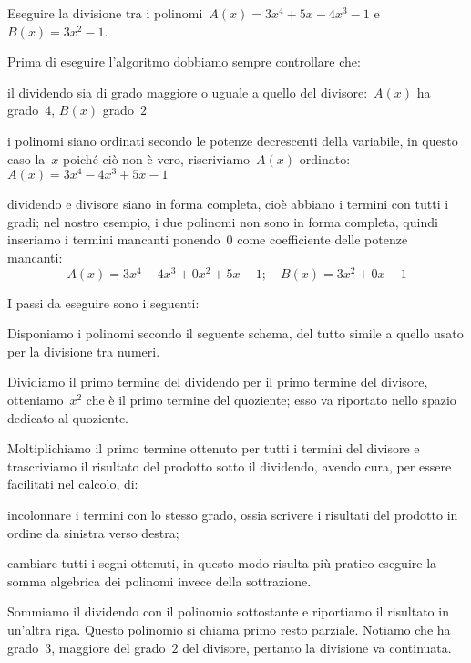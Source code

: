  \begin{esempio}
Eseguire la divisione tra i polinomi~\(A(x)=3x^{4}+5x-4x^{3}-1\) 
e~\(B(x)=3x^{2}-1\).

Prima di eseguire l'algoritmo dobbiamo sempre controllare che:
\begin{itemize*}
 \item il dividendo sia di grado maggiore o uguale a quello del 
 divisore:~\(A(x)\) ha grado~\(4\), \(B(x)\) grado~\(2\)
 \item i polinomi siano ordinati secondo le potenze decrescenti della 
 variabile, in questo caso la~\(x\) poiché ciò
    non è vero, riscriviamo~\(A(x)\) ordinato:~\(A(x)=3x^{4}-4x^{3}+5x-1\)
 \item dividendo e divisore siano in forma completa, cioè abbiano i termini 
 con tutti i gradi; nel nostro esempio, i due polinomi non sono in
    forma completa, quindi inseriamo i termini mancanti ponendo~0 come 
    coefficiente delle potenze mancanti:
    \[A(x)=3x^{4}-4x^{3}+0x^{2}+5x-1; \quad B(x)=3x^{2}+0x-1\]
\end{itemize*}


I passi da eseguire sono i seguenti:

\begin{enumerate*}
 \item 
 Disponiamo i polinomi secondo il seguente schema, del tutto simile a quello 
 usato per la divisione tra numeri.
\begin{center}
%  
\divpola
\end{center}
 \item 
 Dividiamo il primo termine del dividendo per il primo termine del divisore, 
 otteniamo~\(x^{2}\) che è il primo termine del quoziente;
 esso va riportato nello spazio dedicato al quoziente.
\begin{center}
%  
\divpolb
\end{center}
 \item 
 Moltiplichiamo il primo termine ottenuto per tutti i termini del divisore e 
 trascriviamo il risultato del prodotto sotto il dividendo,
 avendo cura, per essere facilitati nel calcolo, di:
\begin{itemize*}
\item incolonnare i termini con lo stesso grado, ossia scrivere i risultati 
del prodotto in ordine da sinistra verso destra;
\item cambiare tutti i segni ottenuti, in questo modo risulta più pratico 
eseguire la somma algebrica dei polinomi invece della sottrazione.
\end{itemize*}
\begin{center}
%  
\divpolc
\end{center}
 \item 
 Sommiamo il dividendo con il polinomio sottostante e riportiamo il risultato 
 in un'altra riga. Questo polinomio si chiama primo resto parziale.
 Notiamo che ha grado~\(3\), maggiore del grado~\(2\) del divisore, pertanto la 
 divisione va continuata.


\end{enumerate*}
\end{esempio}
